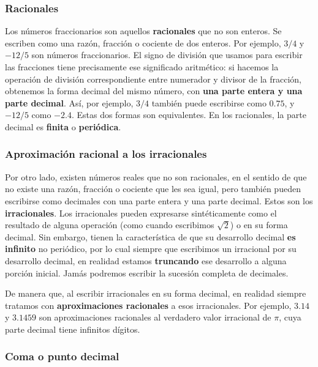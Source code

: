 \documentclass[spanish,A4,]{article}
\begin{document}
\subsubsection{Racionales}\label{racionales}

Los números fraccionarios son aquellos \textbf{racionales} que no son
enteros. Se escriben como una razón, fracción o cociente de dos enteros.
Por ejemplo, $3/4$ y $-12/5$ son números fraccionarios. El signo de
división que usamos para escribir las fracciones tiene precisamente ese
significado aritmético: si hacemos la operación de división
correspondiente entre numerador y divisor de la fracción, obtenemos la
forma decimal del mismo número, con \textbf{una parte entera y una parte
decimal}. Así, por ejemplo, $3/4$ también puede escribirse como $0.75$,
y $-12/5$ como $-2.4$. Estas dos formas son equivalentes. En los
racionales, la parte decimal es \textbf{finita} o \textbf{periódica}.

\subsubsection{Aproximación racional a los
irracionales}\label{aproximaciuxf3n-racional-a-los-irracionales}

Por otro lado, existen números reales que no son racionales, en el
sentido de que no existe una razón, fracción o cociente que les sea
igual, pero también pueden escribirse como decimales con una parte
entera y una parte decimal. Estos son los \textbf{irracionales}. Los
irracionales pueden expresarse sintéticamente como el resultado de
alguna operación (como cuando escribimos $\sqrt 2$) o en su forma
decimal. Sin embargo, tienen la característica de que su desarrollo
decimal \textbf{es infinito} no periódico, por lo cual siempre que
escribimos un irracional por su desarrollo decimal, en realidad estamos
\textbf{truncando} ese desarrollo a alguna porción inicial. Jamás
podremos escribir la sucesión completa de decimales.

De manera que, al escribir irracionales en su forma decimal, en realidad
siempre tratamos con \textbf{aproximaciones racionales} a esos
irracionales. Por ejemplo, $3.14$ y $3.1459$ son aproximaciones
racionales al verdadero valor irracional de $\pi$, cuya parte decimal
tiene infinitos dígitos.

\subsubsection{Coma o punto decimal}\label{coma-o-punto-decimal}
\end{document}
